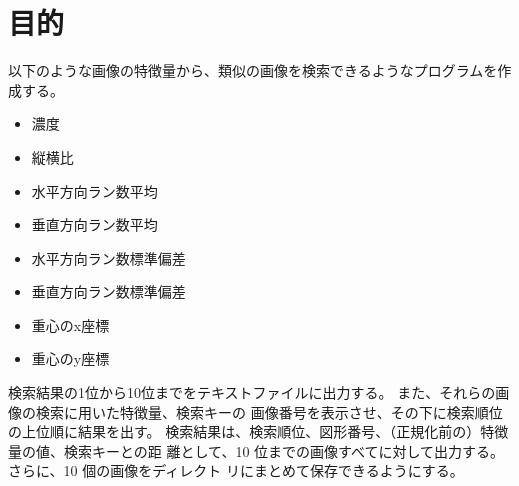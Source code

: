 \section{目的}
以下のような画像の特徴量から、類似の画像を検索できるようなプログラムを作成する。
\begin{itemize}
  \item 濃度
  \item 縦横比
  \item 水平方向ラン数平均
  \item 垂直方向ラン数平均
  \item 水平方向ラン数標準偏差
  \item 垂直方向ラン数標準偏差
  \item 重心のx座標
  \item 重心のy座標
\end{itemize}
検索結果の1位から10位までをテキストファイルに出力する。
また、それらの画像の検索に用いた特徴量、検索キーの
画像番号を表示させ、その下に検索順位の上位順に結果を出す。
検索結果は、検索順位、図形番号、（正規化前の）特徴量の値、検索キーとの距
離として、10 位までの画像すべてに対して出力する。さらに、10 個の画像をディレクト
リにまとめて保存できるようにする。